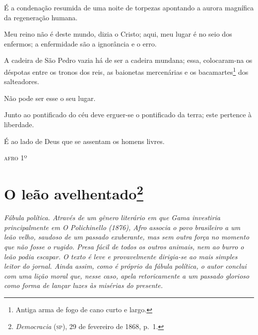 É a condenação resumida de uma noite de torpezas apontando a aurora
magnífica da regeneração humana.

Meu reino não é deste mundo, dizia o Cristo; aqui, meu lugar é no seio
dos enfermos; a enfermidade são a ignorância e o erro.

A cadeira de São Pedro vazia há de ser a cadeira mundana; essa,
colocaram-na os déspotas entre os tronos dos reis, as baionetas
mercenárias e os bacamartes\footnote{Antiga arma de fogo de cano curto
  e largo.} dos salteadores.

Não pode ser esse o seu lugar.

Junto ao pontificado do céu deve erguer-se o pontificado da terra; este
pertence à liberdade.

É ao lado de Deus que se assentam os homens livres.

\begin{flushright}
\textsc{afro} 1º
\end{flushright}

\chapter{O leão avelhentado\footnote{\emph{Democracia} (\textsc{sp}),
  29 de fevereiro de 1868, p.~1.}}

\begin{didascalia}\itshape
{}
Fábula política. Através de um gênero literário em que Gama investiria
principalmente em \textnormal{O Polichinello} (1876), Afro associa o
povo brasileiro a um leão velho, saudoso de um passado exuberante, mas
sem outra força no momento que não fosse o rugido. Presa fácil de todos
os outros animais, nem ao burro o leão podia escapar. O texto é leve e
provavelmente dirigia-se ao mais simples leitor do jornal. Ainda assim,
como é próprio da fábula política, o autor conclui com uma lição moral
que, nesse caso, apela retoricamente a um passado glorioso como forma de
lançar luzes às misérias do presente.
\end{didascalia}


